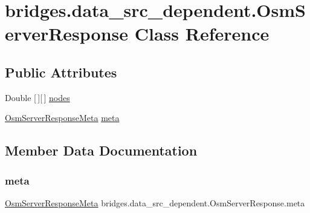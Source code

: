 \hypertarget{classbridges_1_1data__src__dependent_1_1_osm_server_response}{}\section{bridges.\+data\+\_\+src\+\_\+dependent.\+Osm\+Server\+Response Class Reference}
\label{classbridges_1_1data__src__dependent_1_1_osm_server_response}
\subsection*{Public Attributes}
\begin{DoxyCompactItemize}
\item 
Double \mbox{[}$\,$\mbox{]}\mbox{[}$\,$\mbox{]} \mbox{\hyperlink{classbridges_1_1data__src__dependent_1_1_osm_server_response_a09cf784347684b5c551cb88690bd1933}{nodes}}
\item 
\mbox{\hyperlink{classbridges_1_1data__src__dependent_1_1_osm_server_response_meta}{Osm\+Server\+Response\+Meta}} \mbox{\hyperlink{classbridges_1_1data__src__dependent_1_1_osm_server_response_a52c2cacc02fde7bc2f29427c96a400f5}{meta}}
\end{DoxyCompactItemize}


\subsection{Member Data Documentation}
\mbox{\label{classbridges_1_1data__src__dependent_1_1_osm_server_response_a52c2cacc02fde7bc2f29427c96a400f5}} 
\subsubsection{\texorpdfstring{meta}{meta}}
{\footnotesize\ttfamily \mbox{\hyperlink{classbridges_1_1data__src__dependent_1_1_osm_server_response_meta}{Osm\+Server\+Response\+Meta}} bridges.\+data\+\_\+src\+\_\+dependent.\+Osm\+Server\+Response.\+meta}

\mbox{\label{classbridges_1_1data__src__dependent_1_1_osm_server_response_a09cf784347684b5c551cb88690bd1933}} 

